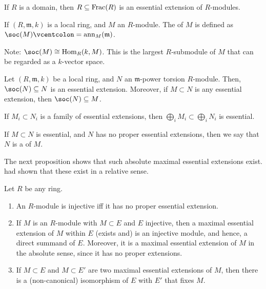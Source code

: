 \documentclass[12pt]{article}
\begin{document}
\begin{ex}
	If $R$ is a domain, then $R \subseteq \operatorname{Frac}(R)$ is an essential extension of $R$-modules.
\end{ex}

\begin{defn}
	If $(R, \mathfrak{m}, k)$ is a local ring, and $M$ an $R$-module. The  of $M$ is defined as $\soc(M) \vcentcolon= \ann_{M}(\mathfrak{m})$.
\end{defn}
Note: $\soc(M) \cong \Hom_{R}(k, M)$. This is the largest $R$-submodule of $M$ that can be regarded as a $k$-vector space. 

\begin{ex}
	Let $(R, \mathfrak{m}, k)$ be a local ring, and $N$ an $\mathfrak{m}$-power torsion $R$-module. Then, $\soc(N) \subset N$ is an essential extension. Moreover, if $M \subset N$ is any essential extension, then $\soc(N) \subset M$.
\end{ex}

\begin{exe}
	If $M_{i} \subset N_{i}$ is a family of essential extensions, then $\bigoplus_{i} M_{i} \subset \bigoplus_{i} N_{i}$ is essential.
\end{exe}

\begin{defn}
	If $M \subset N$ is essential, and $N$ has no proper essential extensions, then we say that $N$ is a  of $M$.
\end{defn}
The next proposition shows that such absolute maximal essential extensions exist.  had shown that these exist in a relative sense.

\begin{prop}
	Let $R$ be any ring.
	\begin{enumerate}[label=(\alph*)]
		\item An $R$-module is injective iff it has no proper essential extension.
		\item If $M$ is an $R$-module with $M \subset E$ and $E$ injective, then a maximal essential extension of $M$ within $E$ (exists and) is an injective module, and hence, a direct summand of $E$. Moreover, it is a maximal essential extension of $M$ in the absolute sense, since it has no proper extensions.
		\item If $M \subset E$ and $M \subset E'$ are two maximal essential extensions of $M$, then there is a (non-canonical) isomorphism of $E$ with $E'$ that fixes $M$.
	\end{enumerate}
\end{prop}
\end{document}
